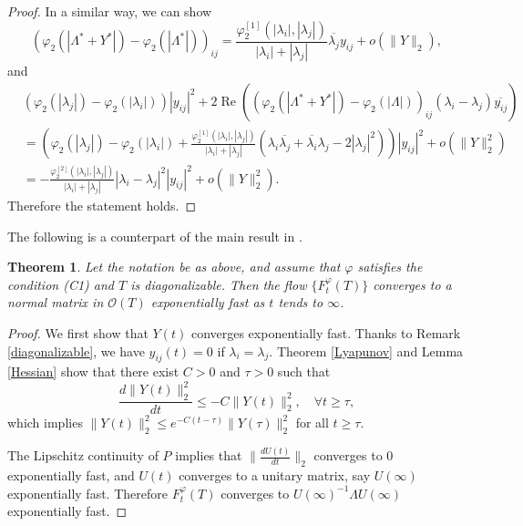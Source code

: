 \documentclass[12pt]{article}
\newtheorem{theorem}{Theorem}[section]
\theoremstyle{definition}
\numberwithin{equation}{section}
\newcommand{\cO}{\mathcal{O}} \newcommand{\cP}{\mathcal{P}}
\renewcommand{\Re}{\operatorname{Re}}
\begin{document}
\begin{proof}
In a similar way, we can show 
\[	(\varphi_2(|\Lambda^*+Y^*|)-\varphi_2(|\Lambda^*|))_{ij}
=\frac{\varphi^{[1]}_2(|\lambda_i|,|\lambda_j|)}{|\lambda_i|+|\lambda_j|}\overline{\lambda_j}y_{ij}+o(\|Y\|_2), \]
and 
\begin{align*}
&(\varphi_2(|\lambda_j|)-\varphi_2(|\lambda_i|)) |y_{ij}|^2
+2\Re\left( (\varphi_2(|\Lambda^*+Y^*|)-\varphi_2(|\Lambda|))_{ij}(\lambda_i-\lambda_j)\overline{y_{ij}}\right)\\
&=\left(\varphi_2(|\lambda_j|)-\varphi_2(|\lambda_i|)
+\frac{\varphi^{[1]}_2(|\lambda_i|,|\lambda_j|)}{|\lambda_i|+|\lambda_j|}
(\lambda_i\overline{\lambda_j}+\overline{\lambda_i}\lambda_j-2|\lambda_j|^2)\right) |y_{ij}|^2+o(\|Y\|_2^2)\\
&=-\frac{\varphi^{[2]}_2(|\lambda_i|,|\lambda_j|)}{|\lambda_i|+|\lambda_j|}
|\lambda_i-\lambda_j|^2|y_{ij}|^2+o(\|Y\|_2^2).
\end{align*}
Therefore the statement holds. 
\end{proof}

The following is a counterpart of the main result in \cite{APS2007}.

\begin{theorem}\label{exponential} Let the notation be as above, and assume that $\varphi$ satisfies the condition (C1) and 
	$T$ is diagonalizable. 
Then the flow $\{F^\varphi_t(T)\}$ converges to a normal matrix in $\cO(T)$ exponentially fast as $t$ tends to $\infty$.  
\end{theorem}

\begin{proof}
We first show that $Y(t)$ converges exponentially fast. 
Thanks to Remark \ref{diagonalizable}, we have $y_{ij}(t)=0$ if $\lambda_i=\lambda_j$. 
Theorem \ref{Lyapunov} and Lemma \ref{Hessian} show that there exist $C>0$ and $\tau>0$ such that 
\[\frac{d\|Y(t)\|_2^2}{dt}\leq -C\|Y(t)\|_2^2,\quad \forall t\geq \tau,\]
which implies $\|Y(t)\|_2^2\leq e^{-C(t-\tau)}\|Y(\tau)\|_2^2$ for all $t\geq \tau$. 

The Lipschitz continuity of $P$ implies that $\|\frac{dU(t)}{dt}\|_2$ converges to 0 exponentially fast, 
and $U(t)$ converges to a unitary matrix, say $U(\infty)$ exponentially fast. 
Therefore $F^\varphi_t(T)$ converges to $U(\infty)^{-1}\Lambda U(\infty)$ exponentially fast.  
\end{proof}
\end{document}
